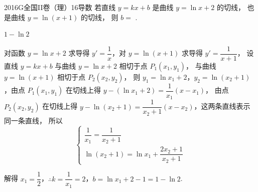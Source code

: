 
\begin{problem}{2016}{G}{全国II卷（理）}{16}{导数}
若直线 $ y = kx + b $ 是曲线 $ y = \ln x + 2 $ 的切线，  也是曲线 $ y = \ln(x+1) $ 的切线，  
则 $ b = $\underline{\hspace{4em}} .
\end{problem}

\begin{answer}
$ 1 - \ln 2 $
\end{answer}

\begin{solutions}
对函数 $ y = \ln x + 2 $ 求导得 $ y' = \dfrac{1}{x} $，对 $ y = \ln(x+1) $ 求导得 $ y' = \dfrac{1}{x+1} $，  
设直线 $ y = kx + b $ 与曲线 $ y = \ln x + 2 $ 相切于点 $ P_1(x_1, y_1) $，  
与曲线 $ y = \ln(x+1) $ 相切于点 $ P_2(x_2, y_2) $，  
则 $ y_1 = \ln x_1 + 2 $，$ y_2 = \ln(x_2 + 1) $，由点 $ P_1(x_1, y_1) $ 在切线上得 $ y - (\ln x_1 + 2) = \dfrac{1}{x_1}(x - x_1) $，  
由点 $ P_2(x_2, y_2) $ 在切线上得 $ y - \ln(x_2 + 1) = \dfrac{1}{x_2 + 1}(x - x_2) $，这两条直线表示同一条直线，  
所以  
\[
\begin{cases}
\dfrac{1}{x_1} = \dfrac{1}{x_2 + 1} \\
\ln(x_2 + 1) = \ln x_1 + \dfrac{2x_2 + 1}{x_2 + 1}
\end{cases}
\]  

解得 $ x_1 = \dfrac{1}{2} $，$ \therefore k = \dfrac{1}{x_1} = 2 $，$ b = \ln x_1 + 2 - 1 = 1 - \ln 2 $.
\end{solutions}